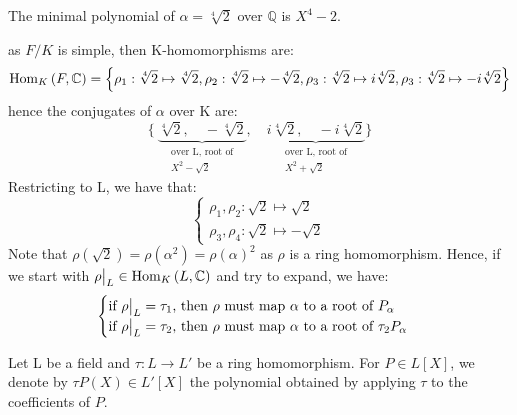 The minimal polynomial of $\alpha = \sqrt[4]{2}$ over $\mathbb{Q}$ is $X^4-2$.
\begin{figure}[H]
  \centering
\end{figure}
as $F/K$ is simple, then K-homomorphisms are:
\begin{equation*}
  \text{Hom}_{K}\left(F, \mathbb{C}\right) = \left\{ \rho_1 : \sqrt[4]{2} \mapsto \sqrt[4]{2}, \rho_2 : \sqrt[4]{2} \mapsto -\sqrt[4]{2}, \rho_3 : \sqrt[4]{2} \mapsto i\sqrt[4]{2}, \rho_3 : \sqrt[4]{2} \mapsto -i\sqrt[4]{2}\right\} 
\end{equation*}
hence the conjugates of $\alpha$ over K are:
\begin{equation*}
  \{\ \underbrace{\sqrt[4]{2},\quad -\sqrt[4]{2}}_{\substack{\text{over L, root of}\\\text{$X^2-\sqrt{2}$}}}, \quad \underbrace{i\sqrt[4]{2},\quad -i\sqrt[4]{2}}_{\substack{\text{over L, root of}\\\text{$X^2+\sqrt{2}$}}}\}
\end{equation*}
Restricting to L, we have that:
\begin{equation*}
  \begin{cases}
    \rho_1, \rho_2 : \sqrt{2}  \mapsto  \sqrt{2} \\
    \rho_3, \rho_4 : \sqrt{2}  \mapsto  -\sqrt{2}
  \end{cases}
\end{equation*}
Note that $\rho(\sqrt{2}) = \rho(\alpha^2) = \rho(\alpha)^2$ as $\rho$ is a ring homomorphism. Hence, if we start with $\restr{\rho}{L} \in \homset{L}{\mathbb{C}}$ and try to expand, we have:
\begin{equation*}
  \begin{cases}
    \text{if $\restr{\rho}{L} = \tau_1$, then $\rho$ must map $\alpha$ to a root of $P_\alpha$} \\
    \text{if $\restr{\rho}{L} = \tau_2$, then $\rho$ must map $\alpha$ to a root of $\tau_2P_\alpha$}
  \end{cases}
\end{equation*}

\begin{definition}\label{def:16}
  Let L be a field and $\tau : L \rightarrow L'$ be a ring homomorphism. For $P \in L[X]$, we denote by $\tau{}P(X) \in L'[X]$ the polynomial obtained by applying $\tau$ to the coefficients of $P$.
\end{definition}

